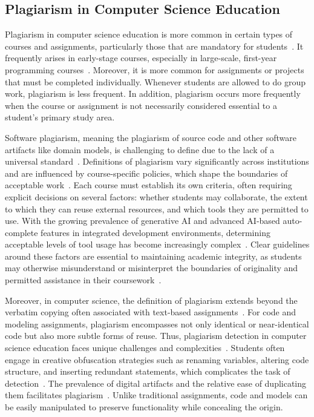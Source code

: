 \subsection{Plagiarism in Computer Science Education}
Plagiarism in computer science education is more common in certain types of courses and assignments, particularly those that are mandatory for students~\cite{Park2003}. It frequently arises in early-stage courses, especially in large-scale, first-year programming courses~\cite{Yan2018}. Moreover, it is more common for assignments or projects that must be completed individually. Whenever students are allowed to do group work, plagiarism is less frequent.
In addition, plagiarism occurs more frequently when the course or assignment is not necessarily considered essential to a student's primary study area.
%

Software plagiarism, meaning the plagiarism of source code and other software artifacts like domain models, is challenging to define due to the lack of a universal standard~\cite{Culwin2001}. Definitions of plagiarism vary significantly across institutions and are influenced by course-specific policies, which shape the boundaries of acceptable work~\cite{Simon2013, Simon2014b, Simon2016, novak2023}. Each course must establish its own criteria, often requiring explicit decisions on several factors: whether students may collaborate, the extent to which they can reuse external resources, and which tools they are permitted to use.
With the growing prevalence of generative AI and advanced AI-based auto-complete features in integrated development environments, determining acceptable levels of tool usage has become increasingly complex~\cite{ChatGPTGuide}. Clear guidelines around these factors are essential to maintaining academic integrity, as students may otherwise misunderstand or misinterpret the boundaries of originality and permitted assistance in their coursework~\cite{Simon2016}.

Moreover, in computer science, the definition of plagiarism extends beyond the verbatim copying often associated with text-based assignments~\cite{Cosma2008}. For code and modeling assignments, plagiarism encompasses not only identical or near-identical code but also more subtle forms of reuse.
Thus, plagiarism detection in computer science education faces unique challenges and complexities~\cite{Cosma2008, Murray2010, Simon2016, Simon2013}. 
Students often engage in creative obfuscation strategies such as renaming variables, altering code structure, and inserting redundant statements, which complicates the task of detection~\cite{Novak2019, Karnalim2016}.
The prevalence of digital artifacts and the relative ease of duplicating them facilitates plagiarism~\cite{Kauffman2015}.
Unlike traditional assignments, code and models can be easily manipulated to preserve functionality while concealing the origin.

